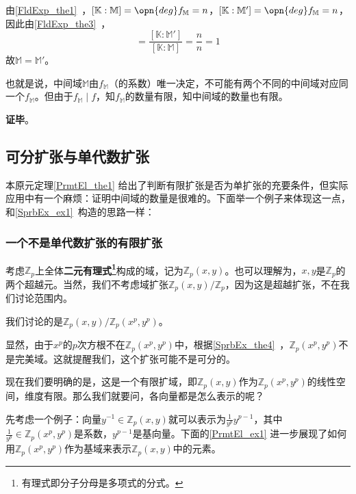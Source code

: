 由\autoref{FldExp_the1}~，$[\mathbb{K}:\mathbb{M}]=\opn{deg}f_\mathbb{M}=n$，$[\mathbb{K}:\mathbb{M}']=\opn{deg}f_\mathbb{M}=n$，因此由\autoref{FldExp_the3}~，
\begin{equation}
[\mathbb{M}:\mathbb{M}']=\frac{[\mathbb{K}:\mathbb{M}']}{[\mathbb{K}:\mathbb{M}]}=\frac{n}{n}=1
\end{equation}
故$\mathbb{M}=\mathbb{M}'$。

也就是说，中间域$\mathbb{M}$由$f_\mathbb{M}$（的系数）唯一决定，不可能有两个不同的中间域对应同一个$f_{\mathbb{M}}$。但由于$f_\mathbb{M}\mid f$，知$f_\mathbb{M}$的数量有限，知中间域的数量也有限。

\textbf{证毕}。


\subsection{可分扩张与单代数扩张}


本原元定理\autoref{PrmtEl_the1} 给出了判断有限扩张是否为单扩张的充要条件，但实际应用中有一个麻烦：证明中间域的数量是很难的。下面举一个例子来体现这一点，和\autoref{SprbEx_ex1}~构造的思路一样：

\subsubsection{一个不是单代数扩张的有限扩张}

考虑$\mathbb{Z}_p$上全体\textbf{二元有理式\footnote{有理式即分子分母是多项式的分式。}}构成的域，记为$\mathbb{Z}_p(x, y)$。也可以理解为，$x, y$是$\mathbb{Z}_p$的两个超越元。当然，我们不考虑域扩张$\mathbb{Z}_p(x, y)/\mathbb{Z}_p$，因为这是超越扩张，不在我们讨论范围内。

我们讨论的是$\mathbb{Z}_p(x, y)/\mathbb{Z}_p(x^p, y^p)$。

显然，由于$x^p$的$p$次方根不在$\mathbb{Z}_p(x^p, y^p)$中，根据\autoref{SprbEx_the4}~，$\mathbb{Z}_p(x^p, y^p)$不是完美域。这就提醒我们，这个扩张可能不是可分的。

现在我们要明确的是，这是一个有限扩域，即$\mathbb{Z}_p(x, y)$作为$\mathbb{Z}_p(x^p, y^p)$的线性空间，维度有限。那么我们就要问，各向量都是怎么表示的呢？

先考虑一个例子：向量$y^{-1}\in\mathbb{Z}_p(x, y)$就可以表示为$\frac{1}{y^p}y^{p-1}$，其中$\frac{1}{y^p}\in\mathbb{Z}_p(x^p, y^p)$是系数，$y^{p-1}$是基向量。下面的\autoref{PrmtEl_ex1} 进一步展现了如何用$\mathbb{Z}_p(x^p, y^p)$作为基域来表示$\mathbb{Z}_p(x, y)$中的元素。

